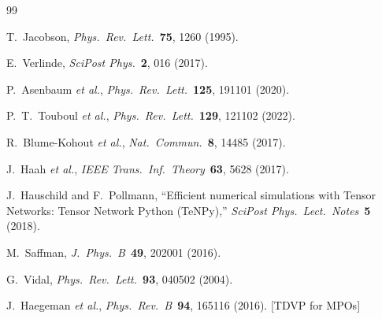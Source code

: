 \documentclass[12pt,letterpaper]{article}
\theoremstyle{plain}
\theoremstyle{definition}
\theoremstyle{remark}
\begin{document}

\begin{thebibliography}{99}

T.~Jacobson, \textit{Phys.\ Rev.\ Lett.}\ \textbf{75}, 1260 (1995).

E.~Verlinde, \textit{SciPost Phys.}\ \textbf{2}, 016 (2017).

P.~Asenbaum \textit{et al.}, \textit{Phys.\ Rev.\ Lett.}\ \textbf{125}, 191101 (2020).

P.~T.~Touboul \textit{et al.}, \textit{Phys.\ Rev.\ Lett.}\ \textbf{129}, 121102 (2022).

R.~Blume-Kohout \textit{et al.}, \textit{Nat.\ Commun.}\ \textbf{8}, 14485 (2017).

J.~Haah \textit{et al.}, \textit{IEEE Trans.\ Inf.\ Theory}\ \textbf{63}, 5628 (2017).

J.~Hauschild and F.~Pollmann,
``Efficient numerical simulations with Tensor Networks: Tensor Network Python (TeNPy),''
\textit{SciPost Phys.\ Lect.\ Notes}\ \textbf{5} (2018).

M.~Saffman, \textit{J.\ Phys.\ B}\ \textbf{49}, 202001 (2016).

G.~Vidal, \textit{Phys.\ Rev.\ Lett.}\ \textbf{93}, 040502 (2004).

J.~Haegeman \textit{et al.}, \textit{Phys.\ Rev.\ B}\ \textbf{94}, 165116 (2016).
[TDVP for MPOs]

\end{thebibliography}
\end{document}
